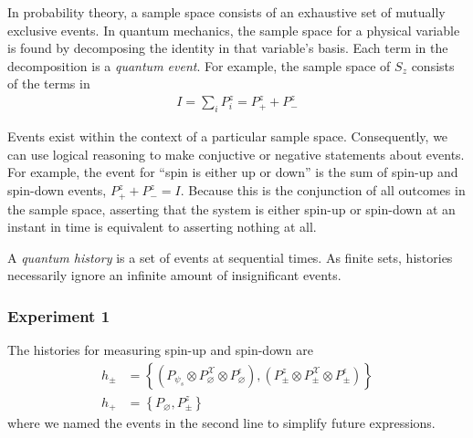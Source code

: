%

In probability theory, a sample space consists of an exhaustive set of mutually exclusive events. In quantum mechanics, the sample space for a physical variable is found by decomposing the identity in that variable's basis. Each term in the decomposition is a \textit{quantum event}. For example, the sample space of $S_z$ consists of the terms in
\begin{align}
  I = \sum_i P^z_i = P^z_+ + P^z_-
\end{align}

Events exist within the context of a particular sample space. Consequently, we can  use logical reasoning to make conjuctive or negative statements about events. For example, the event for ``spin is either up or down'' is the sum of spin-up and spin-down events, $P^z_+ + P^z_- = I$. Because this is the conjunction of all outcomes in the sample space, asserting that the system is either spin-up or spin-down at an instant in time is equivalent to asserting nothing at all.

A \textit{quantum history} is a set of events at sequential times. As finite sets, histories necessarily ignore an infinite amount of insignificant events.

\subsubsection{Experiment 1}
The histories for measuring spin-up and spin-down are
\begin{align}
  h_\pm &= \left\{ \left(P_{\psi_s} \otimes P^\mathcal{X}_\varnothing \otimes P^\epsilon_\varnothing \right), \left(P^z_\pm \otimes P^\mathcal{X}_\pm \otimes P^\epsilon_\pm \right)  \right\}  \\ \nonumber
  h_+ &= \left\{P_\varnothing, P^z_\pm \right\}
\end{align}
where we named the events in the second line to simplify future expressions.

